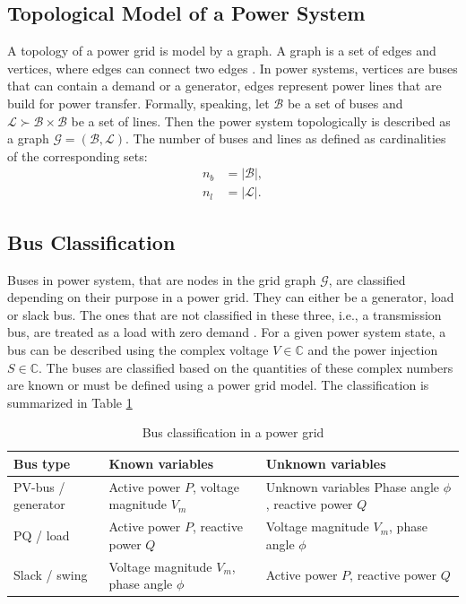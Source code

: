 \subsection{Topological Model of a Power System}
A topology of a power grid is model by a graph. A graph is a set of edges and vertices, where edges can connect two edges \cite{zhuravlev1999discrete}. In power systems, vertices are buses that can contain a demand or a generator, edges represent power lines that are build for power transfer. Formally, speaking, let $\mathcal{B}$ be a set of buses and $\mathcal{L} \succ \mathcal{B} \times \mathcal{B}$ be a set of lines. Then the power system topologically is described as a graph $\mathcal{G} = (\mathcal{B}, \mathcal{L})$. The number of buses and lines as defined as cardinalities of the corresponding sets:
$$
\begin{aligned}
n_b &= |\mathcal{B}|, \\
n_l &= |\mathcal{L}|.
\end{aligned}
$$

\subsection{Bus Classification}

Buses in power system, that are nodes in the grid graph $\mathcal{G}$, are classified depending on their purpose in a power grid. They can either be a generator, load or slack bus. The ones that are not classified in these three, i.e., a transmission bus, are treated as a load with zero demand \cite{machowski2020power}. 
For a given power system state, a bus can be described using the complex voltage $V \in \mathbb{C}$ and the power injection $S \in \mathbb{C}$. The buses are classified based on the quantities of these complex numbers are known or must be defined using a power grid model. The classification is summarized in Table \ref{tab:bus_classif}
\begin{table}
\captionsetup{justification=centering}
\caption{Bus classification in a power grid}
\label{tab:bus_classif}
    \centering
        \begin{tabular} {p{3.5cm}p{4cm}p{2cm}}
        \toprule
        Bus type & Known variables & Unknown variables  \\
        \midrule
        PV-bus / generator & Active power $P$, voltage magnitude $V_m$ & Unknown variables  Phase angle $\phi$, reactive power $Q$ \\
        
        PQ / load & Active power $P$, reactive power $Q$ & Voltage magnitude $V_m$, phase angle $\phi$  \\

        Slack / swing & Voltage magnitude $V_m$, phase angle $\phi$  & Active power $P$, reactive power $Q$  \\
        
        \bottomrule
    \end{tabular}
\end{table}

